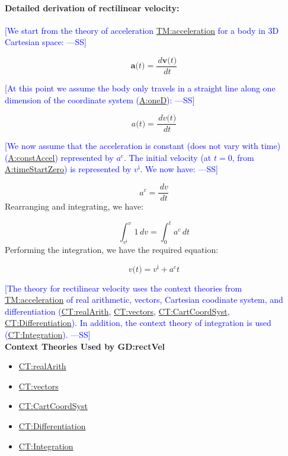 \documentclass[12pt]{article}
\newcommand{\authornote}[3]{\textcolor{#1}{[#3 ---#2]}}
\newcommand{\authornote}[3]{}
\newcommand{\wss}[1]{\authornote{blue}{SS}{#1}}
\begin{document}
\paragraph{Detailed derivation of rectilinear velocity:}
\label{GD:rectVelDeriv}
\wss{We start from the theory of acceleration
\hyperref[TM:acceleration]{TM:acceleration} for a body in 3D Cartesian space:}

$$\symbf{a}\text{(}t\text{)}=\frac{\,d\symbf{v}\text{(}t\text{)}}{\,dt}$$

\wss{At this point we assume the body only travels in a straight line along one
dimension of the coordinate system (\hyperref[oneD]{A:oneD}):}

$${a}\text{(}t\text{)}=\frac{\,d{v}\text{(}t\text{)}}{\,dt}$$

\wss{We now assume that the acceleration is constant (does not vary with time)
(\hyperref[constAccel]{A:constAccel}) represented by ${a^{c}}$. The initial
velocity (at $t=0$, from \hyperref[timeStartZero]{A:timeStartZero}) is
represented by ${v^{\text{i}}}$. We now have:}

\begin{displaymath}
{a^{c}}=\frac{\,dv}{\,dt}
\end{displaymath}
Rearranging and integrating, we have:

\begin{displaymath}
\int_{{v^{\text{i}}}}^{v}{1}\,dv=\int_{0}^{t}{{a^{c}}}\,dt
\end{displaymath}
Performing the integration, we have the required equation:

\begin{displaymath}
v\text{(}t\text{)}={v^{\text{i}}}+{a^{c}} t
\end{displaymath}

\wss{The theory for rectilinear velocity uses the context theories from
\hyperref[TM:acceleration]{TM:acceleration} of real arithmetic, vectors,
Cartesian coodinate system, and differentiation
(\hyperref[CT:realArith]{CT:realArith}, \hyperref[CT:vectors]{CT:vectors},
\hyperref[CT:CartCoordSyst]{CT:CartCoordSyst},
\hyperref[CT:Differentiation]{CT:Differentiation}).  In addition, the context
theory of integration is used (\hyperref[CT:Integration]{CT:Integration}).}
~\\

\noindent \textbf{Context Theories Used by GD:rectVel}

\begin{itemize}
\item \hyperref[CT:realArith]{CT:realArith}
\item \hyperref[CT:vectors]{CT:vectors}
\item \hyperref[CT:CartCoordSyst]{CT:CartCoordSyst}
\item \hyperref[CT:Differentiation]{CT:Differentiation}
\item \hyperref[CT:Integration]{CT:Integration}
\end{itemize}
\end{document}
